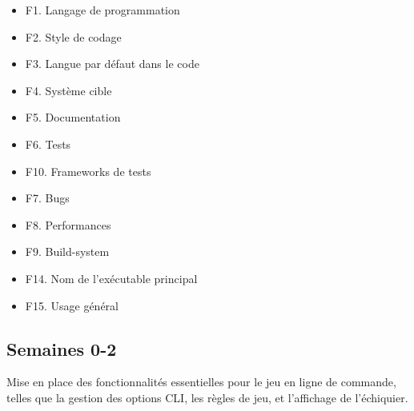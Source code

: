 \documentclass{article}
\begin{document}
\begin{itemize}
    \item F1. Langage de programmation
    \item F2. Style de codage
    \item F3. Langue par défaut dans le code
    \item F4. Système cible
    \item F5. Documentation
    \item F6. Tests
    \item F10. Frameworks de tests
    \item F7. Bugs
    \item F8. Performances
    \item F9. Build-system
    \item F14. Nom de l’exécutable principal
    \item F15. Usage général
\end{itemize}

\subsection{Semaines 0-2}

Mise en place des fonctionnalités essentielles pour le jeu en ligne de commande, telles que la gestion des options CLI, les règles de jeu, et l'affichage de l'échiquier.
\end{document}
